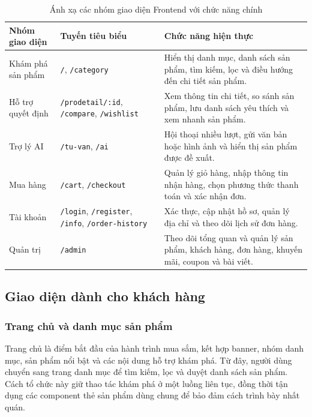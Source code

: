 \begin{table}[H]
    \centering
    \caption{Ánh xạ các nhóm giao diện Frontend với chức năng chính}
    \label{tab:frontend-interface-map}
    \begin{tabularx}{\textwidth}{|>{\RaggedRight\arraybackslash}p{}|>{\RaggedRight\arraybackslash}p{}|X|}
        \hline
        \textbf{Nhóm giao diện} & \textbf{Tuyến tiêu biểu} & \textbf{Chức năng hiện thực} \\
        \hline
        Khám phá sản phẩm & \texttt{/}, \texttt{/category} & Hiển thị danh mục, danh sách sản phẩm, tìm kiếm, lọc và điều hướng đến chi tiết sản phẩm. \\
        \hline
        Hỗ trợ quyết định & \texttt{/prodetail/:id}, \texttt{/compare}, \texttt{/wishlist} & Xem thông tin chi tiết, so sánh sản phẩm, lưu danh sách yêu thích và xem nhanh sản phẩm. \\
        \hline
        Trợ lý AI & \texttt{/tu-van}, \texttt{/ai} & Hội thoại nhiều lượt, gửi văn bản hoặc hình ảnh và hiển thị sản phẩm được đề xuất. \\
        \hline
        Mua hàng & \texttt{/cart}, \texttt{/checkout} & Quản lý giỏ hàng, nhập thông tin nhận hàng, chọn phương thức thanh toán và xác nhận đơn. \\
        \hline
        Tài khoản & \texttt{/login}, \texttt{/register}, \texttt{/info}, \texttt{/order-history} & Xác thực, cập nhật hồ sơ, quản lý địa chỉ và theo dõi lịch sử đơn hàng. \\
        \hline
        Quản trị & \texttt{/admin} & Theo dõi tổng quan và quản lý sản phẩm, khách hàng, đơn hàng, khuyến mãi, coupon và bài viết. \\
        \hline
    \end{tabularx}
\end{table}

\subsection{Giao diện dành cho khách hàng}

\subsubsection{Trang chủ và danh mục sản phẩm}

Trang chủ là điểm bắt đầu của hành trình mua sắm, kết hợp banner, nhóm danh mục, sản phẩm nổi bật
và các nội dung hỗ trợ khám phá. Từ đây, người dùng chuyển sang trang danh mục để tìm kiếm, lọc và
duyệt danh sách sản phẩm. Cách tổ chức này giữ thao tác khám phá ở một luồng liên tục, đồng thời
tận dụng các component thẻ sản phẩm dùng chung để bảo đảm cách trình bày nhất quán.

